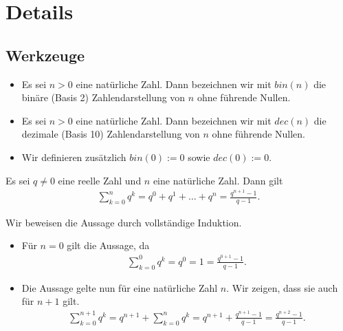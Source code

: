 \chapter{Details}\label{ch:Details}

\section{Werkzeuge}\label{sec:Werkzeuge}
\begin{mydefinition}\label{mydefinition:binunddec}
\leavevmode
\begin{itemize}
	\item Es sei $n>0$ eine natürliche Zahl. Dann bezeichnen wir mit $bin(n)$ die binäre (Basis 2) Zahlendarstellung von $n$ ohne führende Nullen.
	\item Es sei $n>0$ eine natürliche Zahl. Dann bezeichnen wir mit $dec(n)$ die dezimale (Basis 10) Zahlendarstellung von $n$ ohne führende Nullen.
	\item Wir definieren zusätzlich $bin(0) := 0$ sowie $dec(0) := 0$.
\end{itemize}
\end{mydefinition}


\begin{mytheorem}\label{mytheorem:geometrischeSumme}
	Es sei $q \neq 0$ eine reelle Zahl und $n$ eine natürliche Zahl. Dann gilt
	\begin{align*}
		\sum_{k = 0}^n q^k = q^0 + q^1 + \ldots + q^n = \frac{q^{n+1}-1}{q-1}.
	\end{align*}
	\begin{myproof}
		Wir beweisen die Aussage durch vollständige Induktion.
		\begin{itemize}
			\item Für $n = 0$ gilt die Aussage, da
			      \begin{align*}
				      \sum_{k = 0}^0 q^k = q^0 = 1 = \frac{q^{0+1}-1}{q-1}.
			      \end{align*}
			\item Die Aussage gelte nun für eine natürliche Zahl $n$. Wir zeigen, dass sie auch für $n+1$ gilt.
			      \begin{align*}
				      \sum_{k = 0}^{n+1} q^k = q^{n+1} + \sum_{k = 0}^n q^k = q^{n+1} + \frac{q^{n+1}-1}{q-1} = \frac{q^{n+2}-1}{q-1}.
			      \end{align*}
		\end{itemize}
	\end{myproof}
\end{mytheorem}


